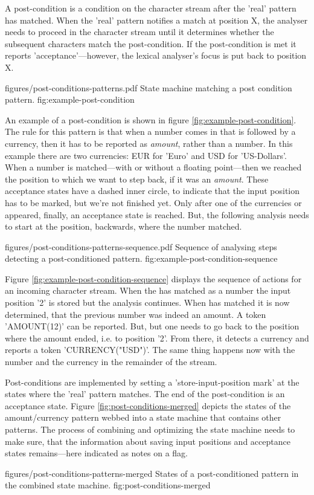 A post-condition is a condition on the character stream after the 'real'
pattern has matched. When the 'real' pattern notifies a match at position X,
the analyser needs to proceed in the character stream until it
determines whether the subsequent characters match the post-condition.
If the post-condition is met it reports 'acceptance'---however, the
lexical analyser's focus is put back to position X.	
        
\showpic
{figures/post-conditions-patterns.pdf}
{State machine matching a post condition pattern.}
{fig:example-post-condition}

An example of a post-condition is shown in figure
\ref{fig:example-post-condition}.  The rule for this pattern is that when a
number comes in that is followed by a currency, then it has to be reported as
{\it amount}, rather than a number. In this example there are two currencies:
EUR for 'Euro' and USD for 'US-Dollars'. When a number is matched---with or
without a floating point---then we reached the position to which we want to step
back, if it was an {\it amount}. These acceptance states have a dashed inner
circle, to indicate that the input position has to be marked, but we're not
finished yet. Only after one of the currencies  or  appeared,
finally, an acceptance state is reached. But, the following analysis
needs to start at the position, backwards, where the number matched. 

\showpic
{figures/post-conditions-patterns-sequence.pdf}
{Sequence of analysing steps detecting a post-conditioned pattern.}
{fig:example-post-condition-sequence}

Figure \ref{fig:example-post-condition-sequence} displays the sequence of
actions for an incoming character stream.  When the  has matched as
a number the input position '2' is stored but the analysis continues. When
 has matched it is now determined, that the previous number was
indeed an amount.  A token 'AMOUNT(12)' can be reported. But, but one needs to
go back to the position where the amount ended, i.e. to position '2'. From
there, it detects a currency  and reports a token
'CURRENCY("USD")'. The same thing happens now with the number 
and the currency  in the remainder of the stream.

Post-conditions are implemented by setting a 'store-input-position mark' at the
states where the 'real' pattern matches. The end of the post-condition is an
acceptance state. Figure \ref{fig:post-conditions-merged}
depicts the states of the amount/currency pattern webbed into a 
state machine that contains other patterns. The process of combining
and optimizing the state machine needs to make sure, that the information
about saving input positions and acceptance states remains---here indicated
as notes on a flag.

\showpic
{figures/post-conditions-patterns-merged}
{States of a post-conditioned pattern in the combined state machine.}
{fig:post-conditions-merged}
